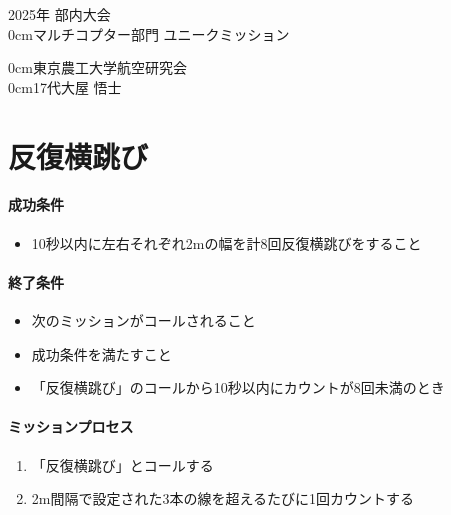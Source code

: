 \documentclass[a4paper,12pt,oneside]{jsarticle}
\begin{document}
\begin{center}
  {\Large
    2025年 部内大会\\
    \vspace*{10truept}
		{\fontsize{15pt} {0cm}\selectfont マルチコプター部門  ユニークミッション}\\ %
		\vspace{30truept}
  }

  \vspace{15truept}	
  {\fontsize{12pt} {0cm}\selectfont 東京農工大学\hspace{5mm}航空研究会}\\
  \vspace{5truept}
  {\fontsize{12pt} {0cm}\selectfont 17代\hspace{5mm}大屋 悟士}\\ %
  \vspace{20truept}
\end{center}
\hrulefill
\tableofcontents

\newpage
\section{反復横跳び}
\paragraph{成功条件}
\begin{itemize}
  \item 10秒以内に左右それぞれ2mの幅を計8回反復横跳びをすること
\end{itemize}

\paragraph{終了条件}
\begin{itemize}
  \item 次のミッションがコールされること
  \item 成功条件を満たすこと
  \item「反復横跳び」のコールから10秒以内にカウントが8回未満のとき
\end{itemize}

\paragraph{ミッションプロセス}
\begin{enumerate}
  \item 「反復横跳び」とコールする
  \item 2m間隔で設定された3本の線を超えるたびに1回カウントする
\end{enumerate}
\end{document}
